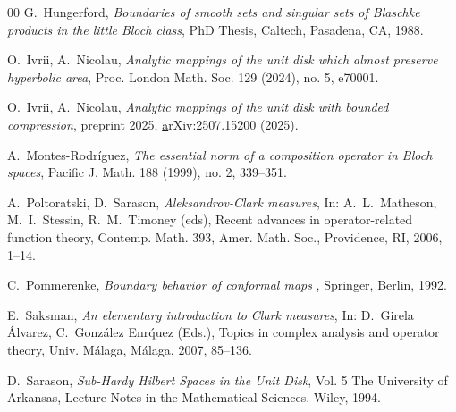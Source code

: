 \documentclass[a4paper,12pt]{article}
\theoremstyle{definition}
\numberwithin{equation}{section}
\begin{document}
\begin{thebibliography}{00}
 G.~Hungerford, {\em Boundaries of smooth sets and singular sets of Blaschke products in the little Bloch
class}\/, PhD Thesis, Caltech, Pasadena, CA, 1988.

\enlargethispage{3pt}





O.~Ivrii, A.~Nicolau, {\em Analytic mappings of the unit disk which almost preserve hyperbolic area}\/, Proc. London Math. Soc. 129 (2024), no. 5, e70001.

O.~Ivrii, A.~Nicolau, {\em Analytic mappings of the unit disk with bounded compression}\/, preprint 2025, \href{https://arxiv.org/abs/2507.15200} arXiv:2507.15200 (2025). 

A.~Montes-Rodr\'iguez, {\em The essential norm of a composition operator in Bloch spaces}\/, Pacific J. Math. 188 (1999), no. 2, 339--351.

 A.~Poltoratski, D.~Sarason, {\em Aleksandrov-Clark measures}\/, In: A.~L.~Matheson, M.~I.~Stessin, R.~M.~Timoney (eds), Recent advances in operator-related function theory, Contemp. Math. 393, Amer. Math. Soc., Providence, RI, 2006, 1--14.

 C.~Pommerenke, {\em Boundary behavior of conformal maps }\/, Springer, Berlin, 1992. 


 E.~Saksman, {\em An elementary introduction to Clark measures}\/, 
 In: D.~Girela \'Alvarez, C.~Gonz\'alez Enr\'quez (Eds.), Topics in complex analysis and operator theory, Univ. M\'alaga, M\'alaga, 2007, 85--136.

 D.~Sarason, {\em Sub-Hardy Hilbert Spaces in the Unit Disk}\/, Vol. 5 The University of Arkansas, Lecture Notes in the Mathematical Sciences. Wiley, 1994. 
 
\end{thebibliography}
\end{document}
